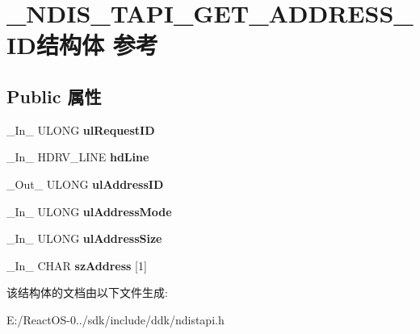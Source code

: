 \hypertarget{struct___n_d_i_s___t_a_p_i___g_e_t___a_d_d_r_e_s_s___i_d}{}\section{\+\_\+\+N\+D\+I\+S\+\_\+\+T\+A\+P\+I\+\_\+\+G\+E\+T\+\_\+\+A\+D\+D\+R\+E\+S\+S\+\_\+\+I\+D结构体 参考}
\label{struct___n_d_i_s___t_a_p_i___g_e_t___a_d_d_r_e_s_s___i_d}
\subsection*{Public 属性}
\begin{DoxyCompactItemize}
\item 
\mbox{\label{struct___n_d_i_s___t_a_p_i___g_e_t___a_d_d_r_e_s_s___i_d_ab984249a7d6590acb181769e9c208606}} 
\+\_\+\+In\+\_\+ U\+L\+O\+NG {\bfseries ul\+Request\+ID}
\item 
\mbox{\label{struct___n_d_i_s___t_a_p_i___g_e_t___a_d_d_r_e_s_s___i_d_ad4af5d19b8d46673e10415c00229f0a6}} 
\+\_\+\+In\+\_\+ H\+D\+R\+V\+\_\+\+L\+I\+NE {\bfseries hd\+Line}
\item 
\mbox{\label{struct___n_d_i_s___t_a_p_i___g_e_t___a_d_d_r_e_s_s___i_d_a503a67afe7e5c98eab5211cf450b668d}} 
\+\_\+\+Out\+\_\+ U\+L\+O\+NG {\bfseries ul\+Address\+ID}
\item 
\mbox{\label{struct___n_d_i_s___t_a_p_i___g_e_t___a_d_d_r_e_s_s___i_d_a0a4578efa8ea9f97039442e2948d02ed}} 
\+\_\+\+In\+\_\+ U\+L\+O\+NG {\bfseries ul\+Address\+Mode}
\item 
\mbox{\label{struct___n_d_i_s___t_a_p_i___g_e_t___a_d_d_r_e_s_s___i_d_aa0a43d85e01b9ef0de0c68c1908d532e}} 
\+\_\+\+In\+\_\+ U\+L\+O\+NG {\bfseries ul\+Address\+Size}
\item 
\mbox{\label{struct___n_d_i_s___t_a_p_i___g_e_t___a_d_d_r_e_s_s___i_d_a8e45d1fdb352a0b0e5ac4e57cda5cb88}} 
\+\_\+\+In\+\_\+ C\+H\+AR {\bfseries sz\+Address} \mbox{[}1\mbox{]}
\end{DoxyCompactItemize}


该结构体的文档由以下文件生成\+:\begin{DoxyCompactItemize}
\item 
E\+:/\+React\+O\+S-\/0../sdk/include/ddk/ndistapi.\+h\end{DoxyCompactItemize}
